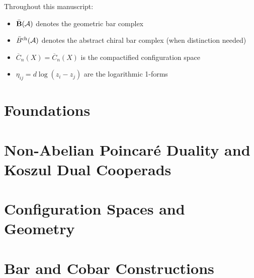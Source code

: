 \documentclass[11pt]{memoir}
\newcommand{\ConfigSpace}[1]{\overline{C}_{#1}(X)}
\newcommand{\LogForm}[2]{\eta_{#1#2}}
\begin{document}
\vspace{1em}

\noindent

\begin{remark}
Throughout this manuscript:
\begin{itemize}
\item $\bar{\mathbf{B}}(\mathcal{A})$ denotes the geometric bar complex
\item $\bar{B}^{\text{ch}}(\mathcal{A})$ denotes the abstract chiral bar complex (when distinction needed)
\item $\ConfigSpace{n} = \overline{C}_n(X)$ is the compactified configuration space
\item $\LogForm{i}{j} = d\log(z_i - z_j)$ are the logarithmic 1-forms
\end{itemize}
\end{remark}

\part{Foundations}



%

\part{Non-Abelian Poincaré Duality and Koszul Dual Cooperads}





\part{Configuration Spaces and Geometry}



\part{Bar and Cobar Constructions}
\end{document}
